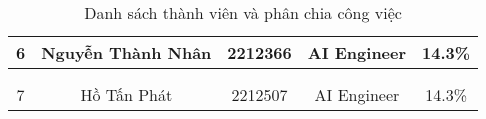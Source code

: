 \begin{table}[H]
\begin{tabular}{|c|c|c|c|c|}
\multirow{-3}{*}{6} & \multirow{-3}{*}{Nguyễn Thành Nhân}       & \multirow{-3}{*}{2212366}         & \multirow{-3}{3cm}{\centering AI Engineer}                & \multirow{-3}{3cm}{14.3\%}                                        \\ \hline
                    &                                           &                                   &                                                           &                                                                   \\ 
                    &                                           &                                   &                                                           &                                                                   \\  
\multirow{-3}{*}{7} & \multirow{-3}{*}{Hồ Tấn Phát}             & \multirow{-3}{*}{2212507}         & \multirow{-3}{3cm}{\centering AI Engineer}                & \multirow{-3}{3cm}{14.3\%}                                        \\ \hline
\end{tabular}
\caption{Danh sách thành viên và phân chia công việc}
\end{table}

\newpage